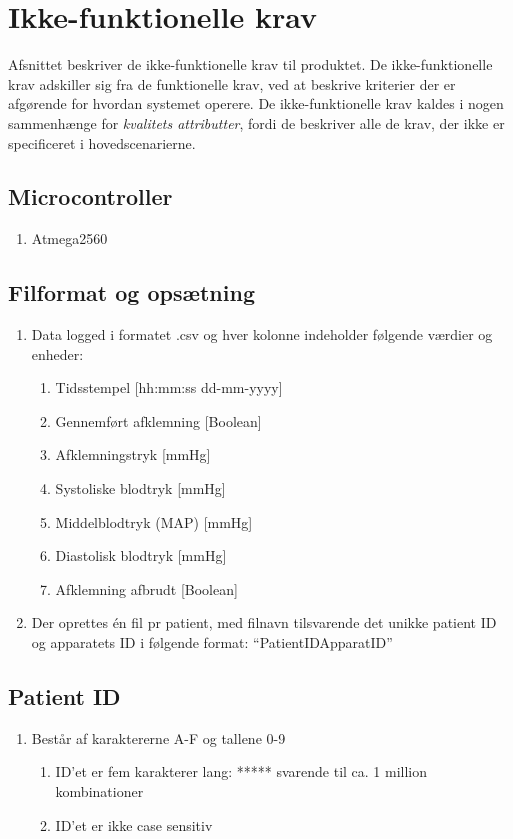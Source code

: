 	\chapter{Ikke-funktionelle krav}
	Afsnittet beskriver de ikke-funktionelle krav til produktet. De ikke-funktionelle krav adskiller sig fra de funktionelle krav, ved at beskrive kriterier der er afgørende for hvordan systemet operere. De ikke-funktionelle krav kaldes i nogen sammenhænge for \textit{kvalitets attributter}, fordi de beskriver alle de krav, der ikke er specificeret i hovedscenarierne.
	
	\section{Microcontroller}
	\begin{enumerate}
		\setlength\itemsep{0cm}
		\item Atmega2560
		\end{enumerate}
	
	\section{Filformat og opsætning}
	\begin{enumerate}
		\setlength\itemsep{0cm} %
		\item Data logged i formatet .csv og hver kolonne indeholder følgende værdier og enheder: 
		\begin{enumerate}
			\item Tidsstempel [hh:mm:ss dd-mm-yyyy]
			\item Gennemført afklemning [Boolean]
			\item Afklemningstryk [mmHg]
			\item Systoliske blodtryk [mmHg]
			\item Middelblodtryk (MAP) [mmHg]
			\item Diastolisk blodtryk [mmHg]
			\item Afklemning afbrudt [Boolean]
		\end{enumerate}
		\item Der oprettes én fil pr patient, med filnavn tilsvarende det unikke patient ID og apparatets ID i følgende format: “PatientIDApparatID”
	\end{enumerate}
	
	\section{Patient ID}
	\begin{enumerate}
		\setlength\itemsep{0cm} %
		\item Består af karaktererne A-F og tallene 0-9
		\begin{enumerate}
			\item ID’et er fem karakterer lang: ***** svarende til ca. 1 million kombinationer
			\item ID’et er ikke case sensitiv
		\end{enumerate}
	\end{enumerate}
	

